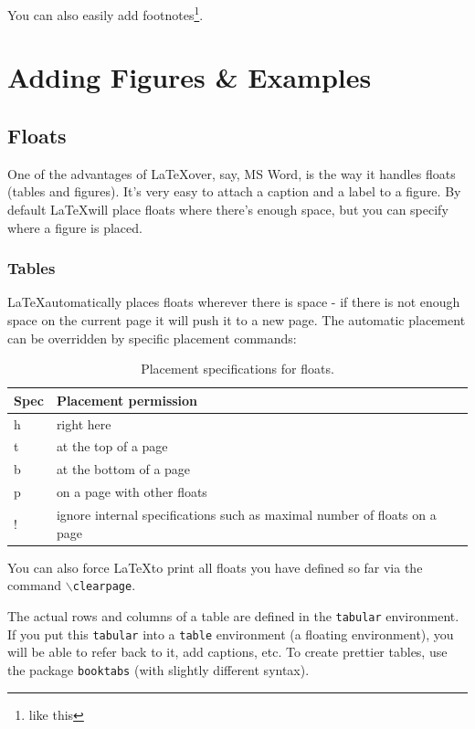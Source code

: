 \documentclass[a4paper, 12pt]{article} %
\begin{document}
You can also easily add footnotes\footnote{like this}.


\section{Adding Figures \& Examples}

\subsection{Floats}

One of the advantages of \LaTeX over, say, MS Word, is the way it handles floats (tables and figures). It's very easy to attach a caption and a label to a figure. By default \LaTeX will place floats where there's enough space, but you can specify where a figure is placed.

\subsubsection{Tables}

\LaTeX automatically places floats wherever there is space - if there is not enough space on the current page it will push it to a new page. The automatic placement can be overridden by specific placement commands:

\begin{table}[h!]
	\centering
	\begin{tabular}{|l l|} \hline
	\textbf{Spec} & \textbf{Placement permission}\\ \hline
	h & right here \\ \hline
	t & at the top of a page \\\hline
	b & at the bottom of a page \\\hline
	p & on a page with other floats \\\hline
	! & ignore internal specifications such as maximal number of floats on a page \\ \hline
	\end{tabular}
\caption{Placement specifications for floats.}
\end{table}

\noindent You can also force \LaTeX to print all floats you have defined so far via the command $\backslash$\texttt{clearpage}.

\noindent The actual rows and columns of a table are defined in the \texttt{tabular} environment. If you put this \texttt{tabular} into a \texttt{table} environment (a floating environment), you will be able to refer back to it, add captions, etc. To create prettier tables, use the package \texttt{booktabs} (with slightly different syntax).
\end{document}
